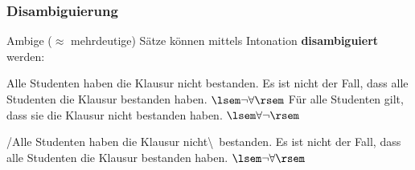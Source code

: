 
\begin{frame}
\frametitle{Disambiguierung}

Ambige ($\approx$ mehrdeutige) Sätze können mittels Intonation  \textbf{disambiguiert} werden: 
	
	  \ea
          Alle Studenten haben die Klausur nicht bestanden.
          \z
        \eal
	\ex Es ist nicht der Fall, dass alle Studenten die Klausur bestanden haben. \hfill $\lsem \neg \forall \rsem$
	\ex Für alle Studenten gilt, dass sie die Klausur nicht bestanden haben. \hfill $\lsem \forall \neg \rsem$
        \zl
\pause 

\ea
/Alle Studenten haben die Klausur  nicht\textbackslash\ bestanden.
\z
\eal
\ex Es ist nicht der Fall, dass alle Studenten die Klausur bestanden haben. \hfill $\lsem \neg \forall \rsem$
	\zl


\end{frame}


